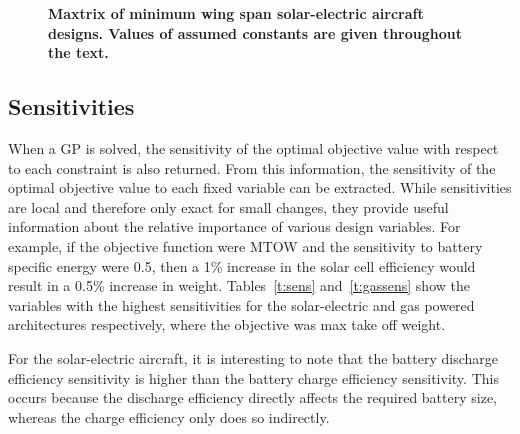  \begin{figure}[H]
 \begin{subfigmatrix}{3}%
 \end{subfigmatrix}
 \caption{\textbf{Maxtrix of minimum wing span solar-electric aircraft designs. Values of assumed constants are given throughout the text.}}
 \label{f:solarcontours}
\end{figure}

\subsection{Sensitivities}

When a GP is solved, the sensitivity of the optimal objective value with respect to each constraint is also returned.  
From this information, the sensitivity of the optimal objective value to each fixed variable can be extracted.\cite{hoburgthesis} 
While sensitivities are local and therefore only exact for small changes, they provide useful information about the relative importance of various design variables. 
For example, if the objective function were MTOW and the sensitivity to battery specific energy were 0.5, then a 1\% increase in the solar cell efficiency would result in a 0.5\% increase in weight.  
Tables~\ref{t:sens} and~\ref{t:gassens} show the variables with the highest sensitivities for the solar-electric and gas powered architectures respectively, where the objective was max take off weight.

For the solar-electric aircraft, it is interesting to note that the battery discharge efficiency sensitivity is higher than the battery charge efficiency sensitivity.
This occurs because the discharge efficiency directly affects the required battery size, whereas the charge efficiency only does so indirectly. 

